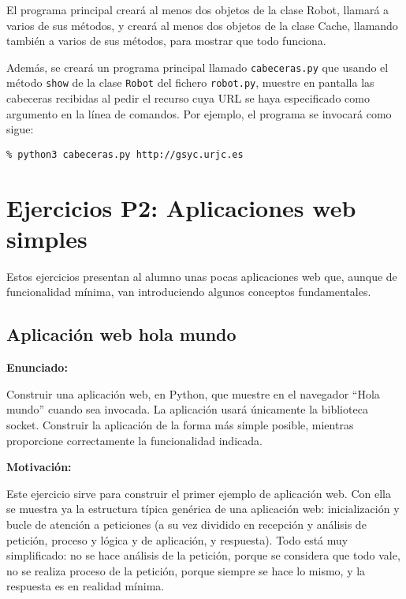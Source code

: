 El programa principal creará al menos dos objetos de la clase Robot, llamará a varios de sus métodos, y creará al menos dos objetos de la clase Cache, llamando también a varios de sus métodos, para mostrar que todo funciona.

Además, se creará un programa principal llamado \verb|cabeceras.py| que usando el método \verb|show| de la clase \verb|Robot| del fichero \verb|robot.py|, muestre en pantalla las cabeceras recibidas al pedir el recurso cuya URL se haya especificado como argumento en la línea de comandos. Por ejemplo, el programa se invocará como sigue:

\begin{verbatim}
% python3 cabeceras.py http://gsyc.urjc.es
\end{verbatim}

\newpage

\section{Ejercicios P2: Aplicaciones web simples}

Estos ejercicios presentan al alumno unas pocas aplicaciones web que, aunque de funcionalidad mínima, van introduciendo algunos conceptos fundamentales.

\subsection{Aplicación web hola mundo}
\label{subsec:aplweb-hola-mundo}

\textbf{Enunciado:}

Construir una aplicación web, en Python, que muestre en el navegador ``Hola mundo'' cuando sea invocada. La aplicación usará únicamente la biblioteca socket. Construir la aplicación de la forma más simple posible, mientras proporcione correctamente la funcionalidad indicada.

\textbf{Motivación:}

Este ejercicio sirve para construir el primer ejemplo de aplicación web. Con ella se muestra ya la estructura típica genérica de una aplicación web: inicialización y bucle de atención a peticiones (a su vez dividido en recepción y análisis de petición, proceso y lógica y de aplicación, y respuesta). Todo está muy simplificado: no se hace análisis de la petición, porque se considera que todo vale, no se realiza proceso de la petición, porque siempre se hace lo mismo, y la respuesta es en realidad mínima.

